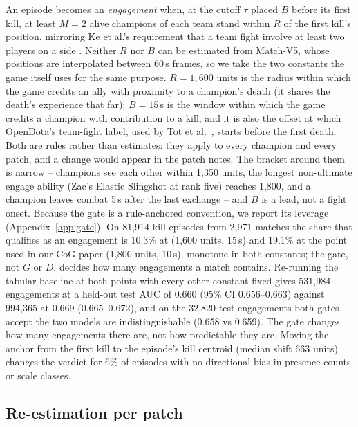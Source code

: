 An episode becomes an \emph{engagement} when, at the cutoff $\tau$ placed $B$ before
its first kill, at least $M=2$ alive champions of each team stand within $R$ of the first
kill's position, mirroring Ke et al.'s requirement that a team fight involve at least two
players on a side \cite{ke2022}. Neither $R$ nor $B$ can be estimated from Match-V5,
whose positions are interpolated between 60\,s frames, so we take the two constants the
game itself uses for the same purpose. $R = 1{,}600$ units is the radius within which the
game credits an ally with proximity to a champion's death (it shares the death's
experience that far); $B = 15$\,s is the window within which the game credits a champion
with contribution to a kill, and it is also the offset at which OpenDota's team-fight
label, used by Tot et al.\ \cite{tot2021camera}, starts before the first death. Both are
rules rather than estimates: they apply to every champion and every patch, and a change
would appear in the patch notes. The bracket around them is narrow -- champions see each
other within 1,350 units, the longest non-ultimate engage ability (Zac's Elastic
Slingshot at rank five) reaches 1,800, and a champion leaves combat 5\,s after the last
exchange -- and $B$ is a lead, not a fight onset. Because the gate is a rule-anchored
convention, we report its leverage (Appendix~\ref{app:gate}). On 81,914 kill episodes
from 2,971 matches the share that qualifies as an engagement is 10.3\% at (1,600 units,
15\,s) and 19.1\% at the point used in our CoG paper (1,800 units, 10\,s), monotone in
both constants; the gate, not $G$ or $D$, decides how many engagements a match contains.
Re-running the tabular baseline at both points with every other constant fixed gives
531,984 engagements at a held-out test AUC of 0.660 (95\% CI 0.656--0.663) against
994,365 at 0.669 (0.665--0.672), and on the 32,820 test engagements both gates accept
the two models are indistinguishable (0.658 vs 0.659). The gate changes how many
engagements there are, not how predictable they are.
Moving the anchor from the first kill to the episode's kill centroid (median shift 663
units) changes the verdict for 6\% of episodes with no directional bias in presence
counts or scale classes.

\subsection{Re-estimation per patch}

